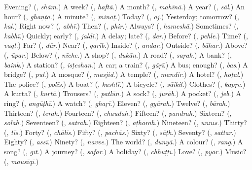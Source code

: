 \begin{tcolorbox}[breakable,colback=teal!4,colframe=teal!35!black,title={Before you move on}]
Evening? (\textbf{}, \emph{shām}.) A week? (\textbf{}, \emph{haftā}.) A month? (\textbf{}, \emph{mahīnā}.) A year? (\textbf{}, \emph{sāl}.) An hour? (\textbf{}, \emph{ghaṇṭā}.) A minute? (\textbf{}, \emph{minaṭ}.) Today? (\textbf{}, \emph{āj}.) Yesterday; tomorrow? (\textbf{}, \emph{kal}.) Right now? (\textbf{}, \emph{abhī}.) Then? (\textbf{}, \emph{phir}.) Always? (\textbf{}, \emph{hameshā}.) Sometimes? (\textbf{}, \emph{kabhī}.) Quickly; early? (\textbf{}, \emph{jaldī}.) A delay; late? (\textbf{}, \emph{der}.) Before? (\textbf{}, \emph{pehle}.) Time? (\textbf{}, \emph{vaqt}.) Far? (\textbf{}, \emph{dūr}.) Near? (\textbf{}, \emph{qarīb}.) Inside? (\textbf{}, \emph{andar}.) Outside? (\textbf{}, \emph{bāhar}.) Above? (\textbf{}, \emph{ūpar}.) Below? (\textbf{}, \emph{nīche}.) A shop? (\textbf{}, \emph{dukān}.) A road? (\textbf{}, \emph{saṛak}.) A bank? (\textbf{}, \emph{baink}.) A station? (\textbf{}, \emph{isṭeshan}.) A car; a train? (\textbf{}, \emph{gāṛī}.) A bus; enough? (\textbf{}, \emph{bas}.) A bridge? (\textbf{}, \emph{pul}.) A mosque? (\textbf{}, \emph{masjid}.) A temple? (\textbf{}, \emph{mandir}.) A hotel? (\textbf{}, \emph{hoṭal}.) The police? (\textbf{}, \emph{polīs}.) A boat? (\textbf{}, \emph{kashtī}.) A bicycle? (\textbf{}, \emph{sāikil}.) Clothes? (\textbf{}, \emph{kapṛe}.) A kurta? (\textbf{}, \emph{kurtā}.) Trousers? (\textbf{}, \emph{patlūn}.) A sock? (\textbf{}, \emph{jurāb}.) A pocket? (\textbf{}, \emph{jeb}.) A ring? (\textbf{}, \emph{angūṭhī}.) A watch? (\textbf{}, \emph{ghaṛī}.) Eleven? (\textbf{}, \emph{gyārah}.) Twelve? (\textbf{}, \emph{bārah}.) Thirteen? (\textbf{}, \emph{terah}.) Fourteen? (\textbf{}, \emph{chaudah}.) Fifteen? (\textbf{}, \emph{pandrah}.) Sixteen? (\textbf{}, \emph{solah}.) Seventeen? (\textbf{}, \emph{satrah}.) Eighteen? (\textbf{}, \emph{aṭhārah}.) Nineteen? (\textbf{}, \emph{unnīs}.) Thirty? (\textbf{}, \emph{tīs}.) Forty? (\textbf{}, \emph{chālīs}.) Fifty? (\textbf{}, \emph{pachās}.) Sixty? (\textbf{}, \emph{sāṭh}.) Seventy? (\textbf{}, \emph{sattar}.) Eighty? (\textbf{}, \emph{assī}.) Ninety? (\textbf{}, \emph{navve}.) The world? (\textbf{}, \emph{dunyā}.) A colour? (\textbf{}, \emph{rang}.) A song? (\textbf{}, \emph{gīt}.) A journey? (\textbf{}, \emph{safar}.) A holiday? (\textbf{}, \emph{chhuṭṭī}.) Love? (\textbf{}, \emph{pyār}.) Music? (\textbf{}, \emph{mausīqī}.)
\end{tcolorbox}

